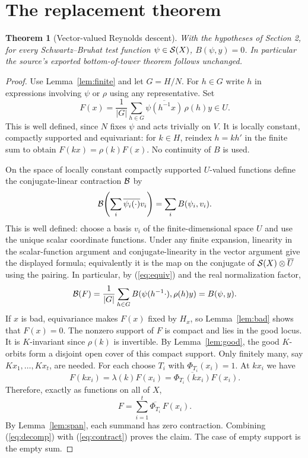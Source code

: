 \documentclass[11pt,letterpaper]{article}
\newtheorem{theorem}{Theorem}[section]\newtheorem{lemma}[theorem]{Lemma}\newtheorem{proposition}[theorem]{Proposition}\theoremstyle{remark}\newtheorem{remark}[theorem]{Remark}
\begin{document}
\section{The replacement theorem}
\begin{theorem}[Vector-valued Reynolds descent]\label{thm:main}
With the hypotheses of Section 2, for every Schwartz--Bruhat test function $\psi\in\mathcal S(X)$, $B(\psi,y)=0$. In particular the source's exported bottom-of-tower theorem follows unchanged.
\end{theorem}
\begin{proof}
Use Lemma~\ref{lem:finite} and let $G=H/N$. For $h\in G$ write $h$ in expressions involving $\psi$ or $\rho$ using any representative. Set
\begin{equation}\label{eq:avg}
 F(x)=\frac1{|G|}\sum_{h\in G}\overline{\psi(h^{-1}x)}\,\rho(h)y\in U.
\end{equation}
This is well defined, since $N$ fixes $\psi$ and acts trivially on $V$. It is locally constant, compactly supported and equivariant: for $k\in H$, reindex $h=kh'$ in the finite sum to obtain $F(kx)=\rho(k)F(x)$. No continuity of $B$ is used.

On the space of locally constant compactly supported $U$-valued functions define the conjugate-linear contraction $\mathcal B$ by
\[
 \mathcal B\!\left(\sum_i\overline{\psi_i(\cdot)}v_i\right)=\sum_i B(\psi_i,v_i).
\]
This is well defined: choose a basis $v_i$ of the finite-dimensional space $U$ and use the unique scalar coordinate functions. Under any finite expansion, linearity in the scalar-function argument and conjugate-linearity in the vector argument give the displayed formula; equivalently it is the map on the conjugate of $\mathcal S(X)\otimes \overline U$ using the pairing. In particular, by (\ref{eq:equiv}) and the real normalization factor,
\begin{equation}\label{eq:contract}
 \mathcal B(F)=\frac1{|G|}\sum_{h\in G} B(\psi(h^{-1}\cdot),\rho(h)y)=B(\psi,y).
\end{equation}
If $x$ is bad, equivariance makes $F(x)$ fixed by $H_x$, so Lemma~\ref{lem:bad} shows that $F(x)=0$. The nonzero support of $F$ is compact and lies in the good locus. It is $K$-invariant since $\rho(k)$ is invertible. By Lemma~\ref{lem:good}, the good $K$-orbits form a disjoint open cover of this compact support. Only finitely many, say $Kx_1,\ldots,Kx_t$, are needed. For each choose $T_i$ with $\Phi_{T_i}(x_i)=1$. At $kx_i$ we have
\[
 F(kx_i)=\lambda(k)F(x_i)=\overline{\Phi_{T_i}(kx_i)}F(x_i).
\]
Therefore, exactly as functions on all of $X$,
\begin{equation}\label{eq:decomp}
 F=\sum_{i=1}^t\overline{\Phi_{T_i}}\,F(x_i).
\end{equation}
By Lemma~\ref{lem:span}, each summand has zero contraction. Combining (\ref{eq:decomp}) with (\ref{eq:contract}) proves the claim. The case of empty support is the empty sum.


\end{proof}
\end{document}
